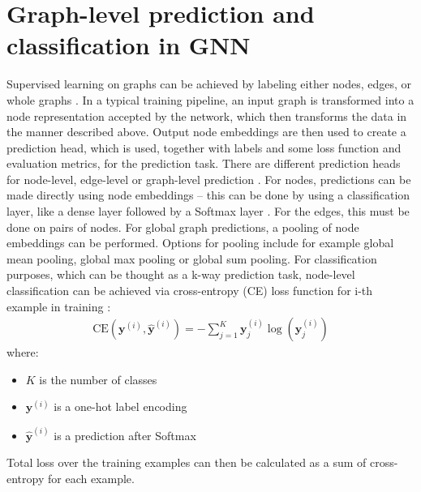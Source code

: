 \section{Graph-level prediction and classification in GNN}
Supervised learning on graphs can be achieved by labeling either nodes, edges, or whole graphs \cite{Lesk2024}. In a typical training pipeline, an input graph is transformed into a node representation accepted by the network, which then transforms the data in the manner described above. Output node embeddings are then used to create a prediction head, which is used, together with labels and some loss function and evaluation metrics, for the prediction task. There are different prediction heads for node-level, edge-level or graph-level prediction \cite{Lesk2024}. For nodes, predictions can be made directly using node embeddings -- this can be done by using a classification layer, like a dense layer followed by a Softmax layer \cite{sanch2021}.  For the edges, this must be done on pairs of nodes. For global graph predictions, a pooling of node embeddings can be performed. Options for pooling include for example global mean pooling, global max pooling or global sum pooling. For classification purposes, which can be thought as a k-way prediction task, node-level classification can be achieved via cross-entropy (CE) loss function for i-th example in training \cite{Lesk2024}:
\begin{align}
    \text{CE}({\mathbf{y}}^{(i)}, {\hat{\mathbf{y}}}^{(i)}) = -\sum_{j=1}^{K} {\mathbf{y}}_{j}^{(i)} \log({\hat{\mathbf{y}}}_{j}^{(i)})
\end{align}
where:
\begin{itemize}
    \item $K$ is the number of classes
    \item ${\mathbf{y}}^{(i)}$ is a one-hot label encoding
    \item ${\hat{\mathbf{y}}}^{(i)}$ is a prediction after Softmax
\end{itemize}
Total loss over the training examples can then be calculated as a sum of cross-entropy for each example.